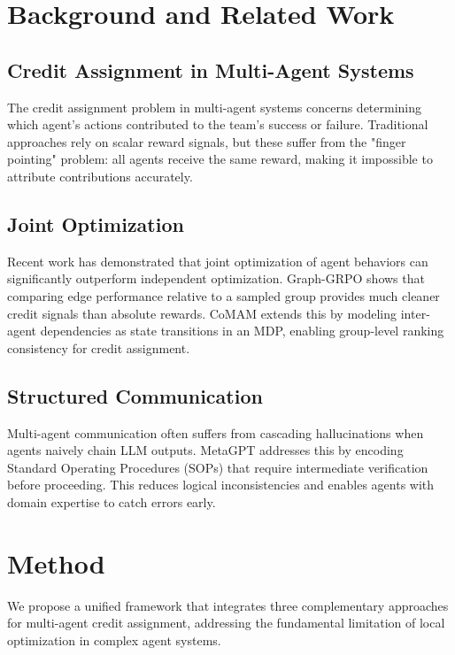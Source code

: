 \documentclass[11pt]{article}
\begin{document}
\section{Background and Related Work}

\subsection{Credit Assignment in Multi-Agent Systems}

The credit assignment problem in multi-agent systems concerns determining
which agent's actions contributed to the team's success or failure.
Traditional approaches rely on scalar reward signals, but these suffer
from the "finger pointing" problem: all agents receive the same reward,
making it impossible to attribute contributions accurately.

\subsection{Joint Optimization}

Recent work has demonstrated that joint optimization of agent behaviors
can significantly outperform independent optimization. Graph-GRPO shows
that comparing edge performance relative to a sampled group provides
much cleaner credit signals than absolute rewards. CoMAM extends this
by modeling inter-agent dependencies as state transitions in an MDP,
enabling group-level ranking consistency for credit assignment.

\subsection{Structured Communication}

Multi-agent communication often suffers from cascading hallucinations
when agents naively chain LLM outputs. MetaGPT addresses this by encoding
Standard Operating Procedures (SOPs) that require intermediate
verification before proceeding. This reduces logical inconsistencies
and enables agents with domain expertise to catch errors early.


\section{Method}
\label{sec:method}

We propose a unified framework that integrates three complementary approaches
for multi-agent credit assignment, addressing the fundamental limitation of
local optimization in complex agent systems.
\end{document}
